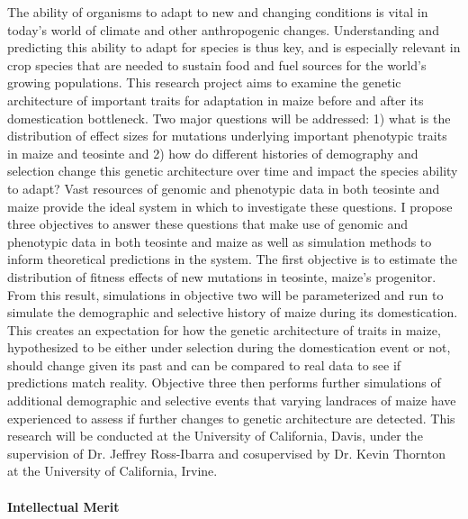 The ability of organisms to adapt to new and changing conditions is vital in today's world of climate and other anthropogenic changes. Understanding and predicting this ability to adapt for species is thus key, and is especially relevant in crop species that are needed to sustain food and fuel sources for the world's growing populations. This research project aims to examine the genetic architecture of important traits for adaptation in maize before and after its domestication bottleneck. Two major questions will be addressed: 1) what is the distribution of effect sizes for mutations %
underlying important phenotypic traits in maize and teosinte and 2) how do different histories of demography and selection change this genetic architecture over time and impact the species ability to adapt? Vast resources of genomic and phenotypic data in both teosinte and maize provide the ideal system in which to investigate these questions. I propose three objectives to answer these questions that make use of genomic and phenotypic data in both teosinte and maize as well as simulation methods to inform theoretical predictions in the system. The first objective is to estimate the distribution of fitness effects of new mutations in teosinte, maize's progenitor. From this result, simulations in objective two will be parameterized and run to simulate %
the demographic and selective history of maize during its domestication. This creates an expectation for how the genetic architecture of traits in maize, hypothesized to be either under selection during the domestication event or not, should change given its past and can be compared to real data to see if predictions match reality. Objective three then performs further simulations of additional demographic and selective events that varying landraces of maize have experienced to assess if further changes to genetic architecture are detected. This research will be conducted at the University of California, Davis, under the supervision of Dr. Jeffrey Ross\--Ibarra and cosupervised by Dr. Kevin Thornton at the University of California, Irvine.

\paragraph{Intellectual Merit}  

